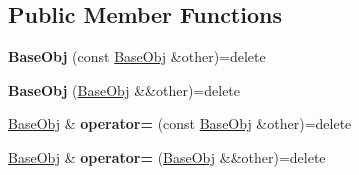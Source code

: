\subsection*{Public Member Functions}
\begin{DoxyCompactItemize}
\item 
\hypertarget{class_helios_1_1_base_obj_aa278e49125c0c84d26906ae47cfff727}{}{\bfseries Base\+Obj} (const \hyperlink{class_helios_1_1_base_obj}{Base\+Obj} \&other)=delete\label{class_helios_1_1_base_obj_aa278e49125c0c84d26906ae47cfff727}

\item 
\hypertarget{class_helios_1_1_base_obj_ad2127aa4f505b6183a9d91d384062b98}{}{\bfseries Base\+Obj} (\hyperlink{class_helios_1_1_base_obj}{Base\+Obj} \&\&other)=delete\label{class_helios_1_1_base_obj_ad2127aa4f505b6183a9d91d384062b98}

\item 
\hypertarget{class_helios_1_1_base_obj_a499a49d6f7f7f79190e6d598eab4391e}{}\hyperlink{class_helios_1_1_base_obj}{Base\+Obj} \& {\bfseries operator=} (const \hyperlink{class_helios_1_1_base_obj}{Base\+Obj} \&other)=delete\label{class_helios_1_1_base_obj_a499a49d6f7f7f79190e6d598eab4391e}

\item 
\hypertarget{class_helios_1_1_base_obj_ab588e3ffe972a53de418f50558651f2f}{}\hyperlink{class_helios_1_1_base_obj}{Base\+Obj} \& {\bfseries operator=} (\hyperlink{class_helios_1_1_base_obj}{Base\+Obj} \&\&other)=delete\label{class_helios_1_1_base_obj_ab588e3ffe972a53de418f50558651f2f}


\end{DoxyCompactItemize}
